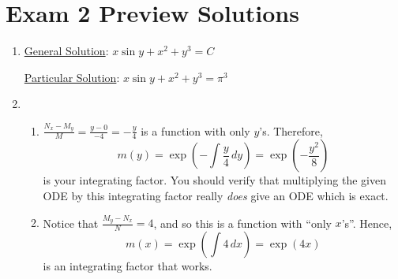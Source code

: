 \documentclass[12pt]{article}
\theoremstyle{definition}
\theoremstyle{underl}
\begin{document}
	\section*{\centering Exam 2 Preview Solutions}
	\vspace{0.125in}
	\begin{enumerate}[topsep=0.125in,itemsep=9mm]
		\item \ul{General Solution}: $x\sin{y}+x^2+y^3=C$
		
		\vspace{3mm}
		\ul{Particular Solution}: $x\sin{y}+x^2+y^3=\pi^3$
		
	
		\item \begin{enumerate}[itemsep=4.5mm]
			\item $\frac{N_x-M_y}{M}=\frac{y-0}{-4}=-\frac{y}{4}$ is a function with only $y$'s. Therefore,
			\[m(y)=\exp\left(-\int\frac{y}{4}\,dy\right)=\exp\left(-\frac{y^2}{8}\right)\]
			is your integrating factor. You should verify that multiplying the given ODE by this integrating factor really \textit{does} give an ODE which is exact.
			\item Notice that $\frac{M_y-N_x}{N}=4$, and so this is a function with ``only $x$'s''. Hence,
			\[m(x)=\exp\left(\int 4\,dx\right)=\exp\left(4x\right)\]
			is an integrating factor that works.
		\end{enumerate}
	

\end{enumerate}
\end{document}
